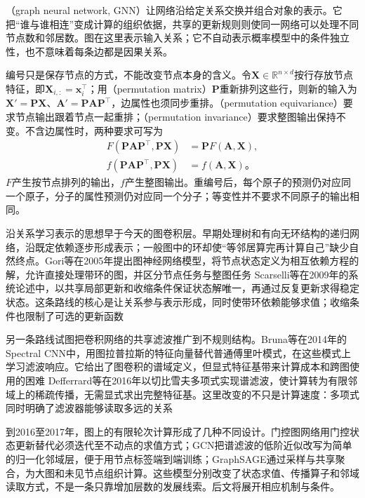 （graph neural network, GNN）让网络沿给定关系交换并组合对象的表示。它把“谁与谁相连”变成计算的组织依据，共享的更新规则则使同一网络可以处理不同节点数和邻居数。图在这里表示输入关系；它不自动表示概率模型中的条件独立性，也不意味着每条边都是因果关系。

编号只是保存节点的方式，不能改变节点本身的含义。令$\bm{X}\in\mathbb{R}^{n\times d}$按行存放节点特征，即$\bm{X}_{i,:}=\bm{x}_i^{\top}$；用（permutation matrix）$\bm{P}$重新排列这些行，则新的输入为$\bm{X}'=\bm{P}\bm{X}$、$\bm{A}'=\bm{P}\bm{A}\bm{P}^{\top}$，边属性也须同步重排。（permutation equivariance）要求节点输出跟着节点一起重排；（permutation invariance）要求整图输出保持不变。不含边属性时，两种要求可写为
\begin{equation}
  \begin{aligned}
    F(\bm{P}\bm{A}\bm{P}^{\top},\bm{P}\bm{X})
      &=\bm{P}F(\bm{A},\bm{X}),\\
    f(\bm{P}\bm{A}\bm{P}^{\top},\bm{P}\bm{X})
      &=f(\bm{A},\bm{X})\text{。}
  \end{aligned}
  \label{eq:gnn-permutation}
\end{equation}
$F$产生按节点排列的输出，$f$产生整图输出。重编号后，每个原子的预测仍对应同一个原子，分子的属性预测仍对应同一个分子；等变性并不要求不同原子的输出相同。

沿关系学习表示的思想早于今天的图卷积层。早期处理树和有向无环结构的递归网络，沿既定依赖逐步形成表示；一般图中的环却使“等邻居算完再计算自己”缺少自然终点。Gori等在2005年提出图神经网络模型，将节点状态定义为相互依赖方程的解，允许直接处理带环的图，并区分节点任务与整图任务 Scarselli等在2009年的系统论述中，以共享局部更新和收缩条件保证状态解唯一，再通过反复更新求得稳定状态。这条路线的核心是让关系参与表示形成，同时使带环依赖能够求值；收缩条件也限制了可选的更新函数

另一条路线试图把卷积网络的共享滤波推广到不规则结构。Bruna等在2014年的Spectral CNN中，用图拉普拉斯的特征向量替代普通傅里叶模式，在这些模式上学习滤波响应。它给出了图卷积的谱域定义，但显式特征基带来计算成本和跨图使用的困难 Defferrard等在2016年以切比雪夫多项式实现谱滤波，使计算转为有限邻域上的稀疏传播，无需显式求出完整特征基。这里改变的不只是计算速度：多项式同时明确了滤波器能够读取多远的关系

到2016至2017年，图上的有限轮次计算形成了几种不同设计。门控图网络用门控状态更新替代必须迭代至不动点的求值方式；GCN把谱滤波的低阶近似改写为简单的归一化邻域层，便于用节点标签端到端训练；GraphSAGE通过采样与共享聚合，为大图和未见节点组织计算。这些模型分别改变了状态求值、传播算子和邻域读取方式，不是一条只靠增加层数的发展线索。后文将展开相应机制与条件。


